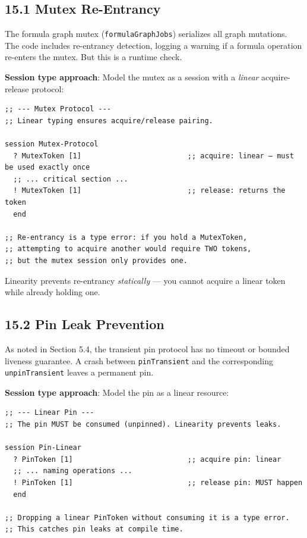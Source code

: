 \documentclass[11pt]{article}
\begin{document}
\subsection{15.1 Mutex Re-Entrancy}
\label{sec:org7cf0b6e}

The formula graph mutex (\texttt{formulaGraphJobs}) serializes all graph mutations.
The code includes re-entrancy detection, logging a warning if a formula
operation re-enters the mutex. But this is a runtime check.

\textbf{Session type approach}: Model the mutex as a session with a \emph{linear}
acquire-release protocol:

\begin{verbatim}
;; --- Mutex Protocol ---
;; Linear typing ensures acquire/release pairing.

session Mutex-Protocol
  ? MutexToken [1]                         ;; acquire: linear — must be used exactly once
  ;; ... critical section ...
  ! MutexToken [1]                         ;; release: returns the token
  end

;; Re-entrancy is a type error: if you hold a MutexToken,
;; attempting to acquire another would require TWO tokens,
;; but the mutex session only provides one.
\end{verbatim}

Linearity prevents re-entrancy \emph{statically} --- you cannot acquire a linear
token while already holding one.
\subsection{15.2 Pin Leak Prevention}
\label{sec:orga57e340}

As noted in Section 5.4, the transient pin protocol has no timeout or
bounded liveness guarantee. A crash between \texttt{pinTransient} and the
corresponding \texttt{unpinTransient} leaves a permanent pin.

\textbf{Session type approach}: Model the pin as a linear resource:

\begin{verbatim}
;; --- Linear Pin ---
;; The pin MUST be consumed (unpinned). Linearity prevents leaks.

session Pin-Linear
  ? PinToken [1]                           ;; acquire pin: linear
  ;; ... naming operations ...
  ! PinToken [1]                           ;; release pin: MUST happen
  end

;; Dropping a linear PinToken without consuming it is a type error.
;; This catches pin leaks at compile time.
\end{verbatim}
\end{document}
